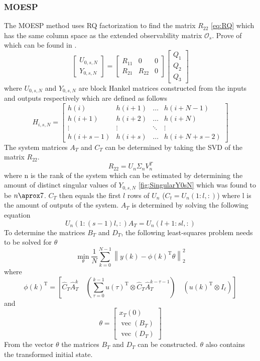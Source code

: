 \subsubsection{MOESP}
The MOESP method uses RQ factorization to find the matrix $R_{22}$ \ref{eq:RQ} which has the same column space as the extended observability matrix $\mathcal{O}_s$. Prove of which can be found in \cite[p.~304--305]{FilteringIdentification}.
\begin{equation}
    \left[\begin{array}{c}
        U_{0, s, N} \\
        Y_{0, s, N}
    \end{array}\right]=\left[\begin{array}{ccc}
        R_{11} & 0 & 0 \\
        R_{21} & R_{22} & 0
    \end{array}\right]\left[\begin{array}{c}
        Q_{1} \\
        Q_{2} \\
        Q_{3}
    \end{array}\right]
    \label{eq:RQ}
\end{equation}
where $U_{0,s,N}$ and $Y_{0,s,N}$ are block Hankel matrices constructed from the inputs and outputs respectively which are defined as follows
$$
H_{i, s, N}=\left[\begin{array}{cccc}
h(i) & h(i+1) & \dots & h(i+N-1) \\
h(i+1) & h(i+2) & \dots & h(i+N) \\
\vdots & \vdots & \ddots & \vdots \\
h(i+s-1) & h(i+s) & \dots & h(i+N+s-2)
\end{array}\right]
$$
The system matrices $A_T$ and $C_T$ can be determined by taking the SVD of the matrix $R_{22}$.
$$
R_{22} = U_n\Sigma_nV_n^T
$$
where n is the rank of the system which can be estimated by determining the amount of distinct singular values of $Y_{0,s,N}$ \ref{fig:SingularY0sN} which was found to be $n\aprox7$.  
$C_T$ then equals the first $l$ rows of $U_n$ ($C_t = U_n(1:l,:)$) where l is the amount of outputs of the system.
$A_T$ is determined by solving the following equation
$$
U_n(1:(s-1)l,:)A_T = U_n(l+1:sl,:)
$$
To determine the matrices $B_T$ and $D_T$, the following least-squares problem needs to be solved for $\theta$
$$
    \min _{\theta} \frac{1}{N} \sum_{k=0}^{N-1}\left\|y(k)-\phi(k)^{\mathrm{T}} \theta\right\|_{2}^{2}
$$
where
$$
    \phi(k)^{\mathrm{T}}=\left[\widehat{C}_{T} \widehat{A}_{T}^{k} \quad\left(\sum_{\tau=0}^{k-1} u(\tau)^{\mathrm{T}} \otimes \widehat{C}_{T} \widehat{A}_{T}^{k-\tau-1}\right) \quad\left(u(k)^{\mathrm{T}} \otimes I_{\ell}\right)\right]
$$
and
$$
    \theta=\left[\begin{array}{c}
    x_{T}(0) \\
    \operatorname{vec}\left(B_{T}\right) \\
    \operatorname{vec}\left(D_{T}\right)
    \end{array}\right]
$$
From the vector $\theta$ the matrices $B_T$ and $D_T$ can be constructed. $\theta$ also contains the transformed initial state.

